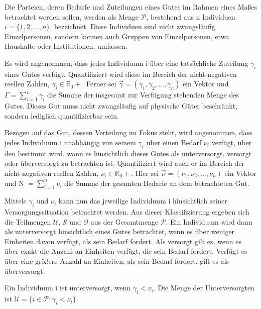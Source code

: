 \documentclass[a4paper]{thesis}
\begin{document}
Die Parteien, deren Bedarfe und Zuteilungen eines Gutes im Rahmen eines Maßes betrachtet werden sollen, werden als Menge $\mathcal{P}$, bestehend aus n Individuen $i=\{1,2,\ldots,n\}$, bezeichnet. Diese Individuen sind nicht zwangsläufig Einzelpersonen, sondern können auch Gruppen von Einzelpersonen, etwa Haushalte oder Institutionen, umfassen.

Es wird angenommen, dass jedes Individuum i über eine tatsächliche Zuteilung $\gamma_i$ eines Gutes verfügt. Quantifiziert wird diese im Bereich der nicht-negativen reellen Zahlen, $\gamma_i\in\mathbb{R}_0+$. Ferner sei $\vec{\gamma}=(\gamma_1,\gamma_2,\ldots,\gamma_n)$ ein Vektor und $\Gamma=\sum_{i=1}^n\gamma_i$ die Summe der insgesamt zur Verfügung stehenden Menge des Gutes. Dieses Gut muss nicht zwangsläufig auf physische Güter beschränkt, sondern lediglich quantifizierbar sein.

Bezogen auf das Gut, dessen Verteilung im Fokus steht, wird angenommen, dass jedes Individuum i unabhängig von seinem $\gamma_i$ über einen Bedarf $\nu_i$ verfügt, über den bestimmt wird, wann es hinsichtlich dieses Gutes als unterversorgt, versorgt oder überversorgt zu betrachten ist. Quantifiziert wird auch er im Bereich der nicht-negativen reellen Zahlen, $\nu_i\in\mathbb{R}_0+$. Hier sei $\vec{\nu}=(\nu_1,\nu_2,\ldots,\nu_n)$ ein Vektor und N $=\sum_{i=1}^n\nu_i$ die Summe der gesamten Bedarfe an dem betrachteten Gut.

Mittels $\gamma_i$ und $\nu_i$ kann nun das jeweilige Individuum i hinsichtlich seiner Versorgungssituation betrachtet werden. Aus dieser Klassifizierung ergeben sich die Teilmengen $\mathcal{U}$, $\mathcal{S}$ und $\mathcal{O}$ aus der Gesamtmenge $\mathcal{P}$. Ein Individuum wird dann als unterversorgt hinsichtlich eines Gutes betrachtet, wenn es über weniger Einheiten davon verfügt, als sein Bedarf fordert. Als versorgt gilt es, wenn es über exakt die Anzahl an Einheiten verfügt, die sein Bedarf fordert. Verfügt es über eine größere Anzahl an Einheiten, als sein Bedarf fordert, gilt es als überversorgt.

\begin{Definition}[Unterversorgung]
Ein Individuum i ist unterversorgt, wenn $\gamma_i<\nu_i$. Die Menge der Unterversorgten ist $\mathcal{U}=\{i\in\mathcal{P}:\gamma_i<\nu_i\}$.
\end{Definition}
\end{document}
